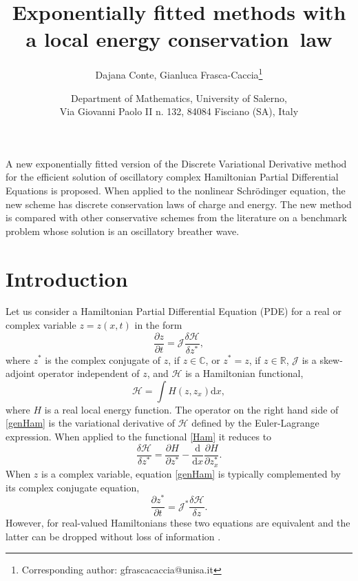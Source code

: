 \documentclass[twoside]{article}
\numberwithin{equation}{section}
\begin{document}
\title{Exponentially fitted methods with a local energy conservation~law}

\author{Dajana Conte, Gianluca Frasca-Caccia\footnote{Corresponding author: gfrascacaccia@unisa.it}}
\date{\normalsize Department of Mathematics, University of Salerno,\\ Via Giovanni Paolo II n. 132, 84084 Fisciano (SA), Italy}
\maketitle


\abstract A new exponentially fitted version of the Discrete Variational Derivative method for the efficient solution of  oscillatory complex  Hamiltonian Partial Differential Equations is proposed. When applied to the nonlinear Schr\"odinger equation, the new scheme has discrete conservation laws of charge and energy. The new method is compared with other conservative schemes from the literature on a benchmark problem whose solution is an oscillatory breather wave.

\section{Introduction}
Let us consider a Hamiltonian Partial Differential Equation (PDE) for a real or complex variable $z=z(x,t)$ in the form
\begin{equation}\label{genHam}
\frac{\partial z}{\partial t}=\mathcal{J}\frac{\delta \mathcal H}{\delta z^*},
\end{equation}
where $z^*$ is the complex conjugate of $z$, if $z\in\mathbb{C}$, or $z^*=z$, if $z\in\mathbb{R}$, $\mathcal{J}$ is a skew-adjoint operator independent of $z$, and $\mathcal{H}$ is a Hamiltonian functional,
\begin{equation}\label{Ham}
\mathcal{H}=\int H(z,z_x) \mathrm{d}x,
\end{equation}
where $H$ is a real local energy function. The operator on the right hand side of \eqref{genHam} is the variational derivative of $\mathcal{H}$ defined by the Euler-Lagrange expression. When applied to the functional \eqref{Ham} it reduces to
\begin{equation}\label{varder}
\frac{\delta \mathcal{H}}{\delta z^*}=\frac{\partial H}{\partial z^*}-\frac{\mathrm d}{\mathrm d x}\frac{\partial H}{\partial z_x^*}.
\end{equation}
When $z$ is a complex variable, equation \eqref{genHam} is typically complemented by its complex conjugate equation,
$$\frac{\partial z^*}{\partial t}=\mathcal{J}^*\frac{\delta \mathcal H}{\delta z}.$$
However, for real-valued Hamiltonians these two equations are equivalent and the latter can be dropped without loss of information \cite{Bodu2}.
\end{document}
